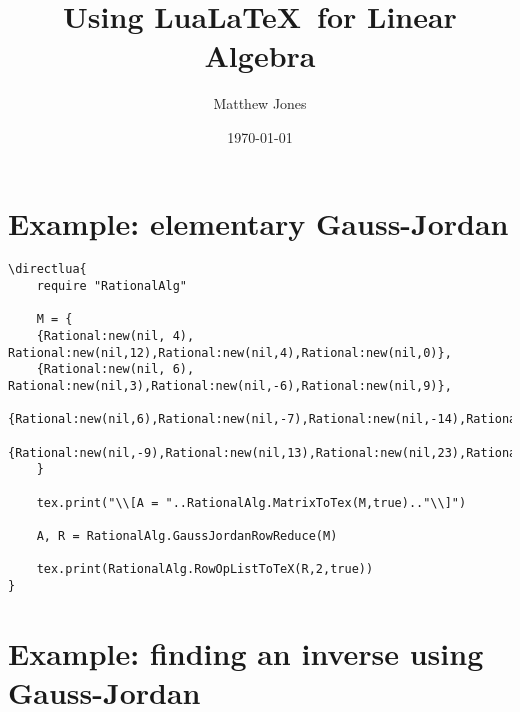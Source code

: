\documentclass[11pt]{article}
\title{Using Lua\LaTeX\ for Linear Algebra}
\author{Matthew Jones}
\date{\today}
\begin{document}
\maketitle

\section*{Example: elementary Gauss-Jordan}

\begin{lstlisting}
\directlua{
    require "RationalAlg"
    
    M = {
    {Rational:new(nil, 4), Rational:new(nil,12),Rational:new(nil,4),Rational:new(nil,0)},
    {Rational:new(nil, 6), Rational:new(nil,3),Rational:new(nil,-6),Rational:new(nil,9)},
    {Rational:new(nil,6),Rational:new(nil,-7),Rational:new(nil,-14),Rational:new(nil,15)},
    {Rational:new(nil,-9),Rational:new(nil,13),Rational:new(nil,23),Rational:new(nil,-24)}
    }

    tex.print("\\[A = "..RationalAlg.MatrixToTex(M,true).."\\]")

    A, R = RationalAlg.GaussJordanRowReduce(M)
    
    tex.print(RationalAlg.RowOpListToTeX(R,2,true))
}    
\end{lstlisting}


\pagebreak
\section*{Example: finding an inverse using Gauss-Jordan}
\end{document}

